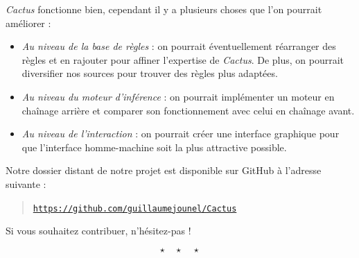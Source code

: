 \documentclass[a4paper,12pt]{article}
\begin{document}
	\textit{Cactus} fonctionne bien, cependant il y a plusieurs choses que l'on pourrait améliorer :
	\begin{itemize}
		\item \textit{Au niveau de la base de règles} : on pourrait éventuellement réarranger des règles et en rajouter pour affiner l'expertise de \textit{Cactus}. De plus, on pourrait diversifier nos sources pour trouver des règles plus adaptées.
		\item \textit{Au niveau du moteur d'inférence} : on pourrait implémenter un moteur en chaînage arrière et comparer son fonctionnement avec celui en chaînage avant.
		\item \textit{Au niveau de l'interaction} : on pourrait créer une interface graphique pour que l'interface homme-machine soit la plus attractive possible.
	\end{itemize}
	
	Notre dossier distant de notre projet est disponible sur GitHub à l'adresse suivante :
	
	\begin{quote}
		\href{https://github.com/guillaumejounel/Cactus}{\texttt{https://github.com/guillaumejounel/Cactus}}
	\end{quote}
	
	
	Si vous souhaitez contribuer, n'hésitez-pas !	

\[ \star \quad \star \quad \star \]
\newpage

\end{document}
